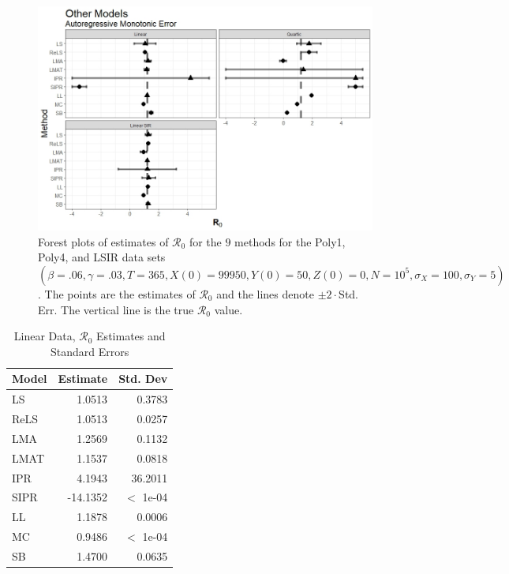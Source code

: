 \documentclass[12pt]{article}
\newcommand{\xxsir}{\ensuremath{9} } %
\newcommand{\rr}{\ensuremath{\mathcal{R}_0}}
\begin{document}
\begin{figure}[H]
	\begin{center}
		\includegraphics[scale=0.5]{images/other_arm.jpeg}
		\caption{Forest plots of estimates of $\rr$ for the \xxsir methods for the Poly1, Poly4, and LSIR data sets $(\beta=.06, \gamma=.03, T=365, X(0)=99950, Y(0)=50, Z(0)=0, N=10^5, \sigma_X=100, \sigma_Y=5)$.  The points are the estimates of $\rr$ and the lines denote $\pm 2\cdot $Std. Err.  The vertical line is the true $\rr$ value.}
	\end{center}
\end{figure}

\begin{table}[H]
	
	\centering
	\begin{tabular}[t]{l|r|r}
		\hline
		Model & Estimate & Std. Dev\\
		\hline
		LS & 1.0513 & 0.3783\\
		\hline
		ReLS & 1.0513 & 0.0257\\
		\hline
		LMA & 1.2569 & 0.1132\\
		\hline
		LMAT & 1.1537 & 0.0818\\
		\hline
		IPR & 4.1943 & 36.2011\\
		\hline
		SIPR & -14.1352 & $<$ 1e-04\\
		\hline
		LL & 1.1878 & 0.0006\\
		\hline
		MC & 0.9486 & $<$ 1e-04\\
		\hline
		SB & 1.4700 & 0.0635\\
		\hline
	\end{tabular}
	\caption{Linear Data, $\rr$ Estimates and Standard Errors}
\end{table}
\end{document}
